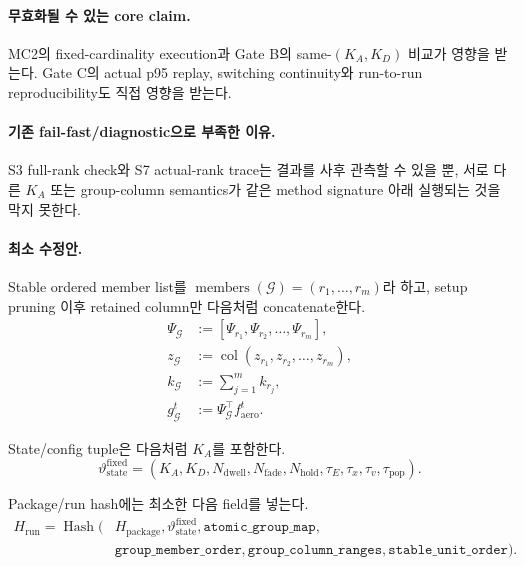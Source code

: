\documentclass[11pt]{article}
\begin{document}
\paragraph{무효화될 수 있는 core claim.}
MC2의 fixed-cardinality execution과 Gate B의 same-$(K_A,K_D)$ 비교가 영향을 받는다.
Gate C의 actual p95 replay, switching continuity와 run-to-run reproducibility도 직접 영향을 받는다.

\paragraph{기존 fail-fast/diagnostic으로 부족한 이유.}
S3 full-rank check와 S7 actual-rank trace는 결과를 사후 관측할 수 있을 뿐,
서로 다른 $K_A$ 또는 group-column semantics가 같은 method signature 아래 실행되는 것을 막지 못한다.

\paragraph{최소 수정안.}
Stable ordered member list를
$\operatorname{members}(\mathcal G)=(r_1,\ldots,r_m)$라 하고,
setup pruning 이후 retained column만 다음처럼 concatenate한다.
\begin{align}
  \Psi_{\mathcal G}
  &:=
  \left[\Psi_{r_1},\Psi_{r_2},\ldots,\Psi_{r_m}\right],
  \\
  z_{\mathcal G}
  &:=
  \operatorname{col}\left(z_{r_1},z_{r_2},\ldots,z_{r_m}\right),
  \\
  k_{\mathcal G}
  &:=
  \sum_{j=1}^{m}k_{r_j},
  \\
  g_{\mathcal G}^t
  &:=
  \Psi_{\mathcal G}^{\top}f_{\mathrm{aero}}^t.
\end{align}

State/config tuple은 다음처럼 $K_A$를 포함한다.
\begin{equation}
  \vartheta_{\mathrm{state}}^{\mathrm{fixed}}
  =
  \left(
  K_A,K_D,
  N_{\mathrm{dwell}},N_{\mathrm{fade}},N_{\mathrm{hold}},
  \tau_E,\tau_x,\tau_v,\tau_{\mathrm{pop}}
  \right).
\end{equation}

Package/run hash에는 최소한 다음 field를 넣는다.
\begin{equation}
\begin{aligned}
  H_{\mathrm{run}}
  =\operatorname{Hash}\bigl(&H_{\mathrm{package}},
  \vartheta_{\mathrm{state}}^{\mathrm{fixed}},
  \texttt{atomic\_group\_map},\\
  &\texttt{group\_member\_order},
  \texttt{group\_column\_ranges},
  \texttt{stable\_unit\_order}\bigr).
\end{aligned}
\end{equation}
\end{document}
